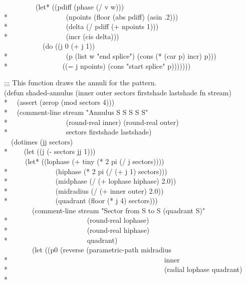 \begin{new}
\begin{lisp}
~~~~~~~~~(let* ((pdiff (phase (/ v w))) \\*
~~~~~~~~~~~~~~~~(npoints (floor (abs pdiff) (asin .2))) \\*
~~~~~~~~~~~~~~~~(delta (/ pdiff (+ npoints 1))) \\*
~~~~~~~~~~~~~~~~(incr (cis delta))) \\
~~~~~~~~~~~(do ((j 0 (+ j 1)) \\*
~~~~~~~~~~~~~~~~(p (list w "end splice") (cons (* (car p) incr) p))) \\*
~~~~~~~~~~~~~~~((= j npoints) (cons "start splice" p))))))) \\
\end{lisp}
\begin{lisp}
;;; This function draws the annuli for the pattern. \\
(defun shaded-annulus (inner outer sectors firstshade lastshade fn stream) \\*
~~(assert (zerop (mod sectors 4))) \\*
~~(comment-line stream "Annulus {\Xtilde}S {\Xtilde}S {\Xtilde}S {\Xtilde}S {\Xtilde}S" \\*
~~~~~~~~~~~~~~~~(round-real inner) (round-real outer) \\*
~~~~~~~~~~~~~~~~sectors firstshade lastshade) \\
~~(dotimes (jj sectors) \\*
~~~~(let ((j (- sectors jj 1))) \\
~~~~~~(let* ((lophase (+ tiny (* 2 pi (/ j sectors)))) \\*
~~~~~~~~~~~~~(hiphase (* 2 pi (/ (+ j 1) sectors))) \\*
~~~~~~~~~~~~~(midphase (/ (+ lophase hiphase) 2.0)) \\*
~~~~~~~~~~~~~(midradius (/ (+ inner outer) 2.0)) \\*
~~~~~~~~~~~~~(quadrant (floor (* j 4) sectors))) \\
~~~~~~~~(comment-line stream "Sector from {\Xtilde}S to {\Xtilde}S (quadrant {\Xtilde}S)" \\*
~~~~~~~~~~~~~~~~~~~~~~(round-real lophase) \\*
~~~~~~~~~~~~~~~~~~~~~~(round-real hiphase) \\*
~~~~~~~~~~~~~~~~~~~~~~quadrant) \\
~~~~~~~~(let ((p0 (reverse (parametric-path midradius \\*
~~~~~~~~~~~~~~~~~~~~~~~~~~~~~~~~~~~~~~~~~~~~inner \\*
~~~~~~~~~~~~~~~~~~~~~~~~~~~~~~~~~~~~~~~~~~~~(radial lophase quadrant) \\*

\end{lisp}
\end{new}
